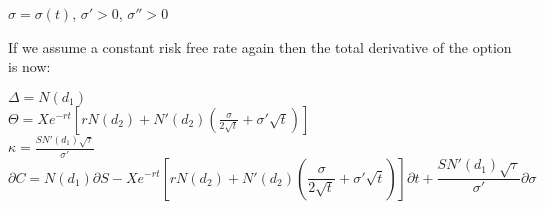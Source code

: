 \documentclass{article}
\begin{document}
$\sigma=\sigma(t)$, 
$\sigma{'}>0$,
$\sigma{''}>0$

If we assume a constant risk free rate again then the total derivative of the option is now:

$\Delta=N(d_{1})$\\
$\Theta=Xe^{-rt}[rN(d_{2})+N'(d_{2})(\frac{\sigma}{2\sqrt{t}}+\sigma{'}\sqrt{t})]$\\
$\kappa=\frac{SN'(d_1)\sqrt{\tau}}{\sigma'}$
\begin{equation}
\partial{C}=N(d_{1})\partial{S}-Xe^{-rt}[rN(d_{2})+N'(d_{2})(\frac{\sigma}{2\sqrt{t}}+\sigma{'}\sqrt{t})]\partial{t}+\frac{SN'(d_1)\sqrt{\tau}}{\sigma'}\partial{\sigma}
\end{equation}
\end{document}
